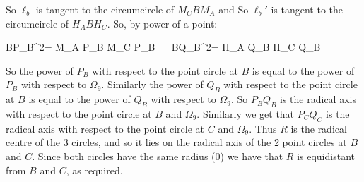 \documentclass[a4paper, 12pt]{article}
\begin{document}
\begin{enumerate}
	So $\ell_b$ is tangent to the circumcircle of $M_C B M_A$ and So $\ell_b '$ is tangent to the circumcircle of $H_A B H_C$. So, by power of a point:
	\begin{flalign}
		BP_B^2= M_A P_B \cdot M_C P_B \  \ BQ_B^2= H_A Q_B \cdot H_C Q_B \nonumber
	\end{flalign}
	So the power of $P_B$ with respect to the point circle at $B$ is equal to the power of $P_B$ with respect to $\Omega_9$. Similarly the power of $Q_B$ with respect to the point circle at $B$ is equal to the power of $Q_B$ with respect to $\Omega_9$. So $P_B Q_B$ is the radical axis with respect to the point circle at $B$ and $\Omega_9$. Similarly we get that $P_C Q_C$ is the radical axis with respect to the point circle at $C$ and $\Omega_9$. Thus $R$ is the radical centre of the 3 circles, and so it lies on the radical axis of the 2 point circles at $B$ and $C$. Since both circles have the same radius (0) we have that $R$ is equidistant from $B$ and $C$, as required.

    

\end{enumerate}
\end{document}
